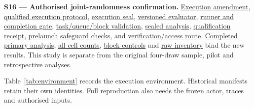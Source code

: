 \documentclass[12pt,a4paper]{article}
\begin{document}
\label{source-s16}

\textbf{S16 --- Authorised joint-randomness confirmation.} \href{\detokenize{../joint_confirmation_2026-09-08/confirmation/EXECUTION_AMENDMENT.md}}{Execution amendment}, \href{\detokenize{../joint_confirmation_2026-09-08/confirmation/PROTOCOL_EXECUTION.md}}{qualified execution protocol}, \href{\detokenize{../joint_confirmation_2026-09-08/confirmation/SEALED_EXECUTION.json}}{execution seal}, \href{\detokenize{../joint_confirmation_2026-09-08/experimental/evaluator_v2.py}}{versioned evaluator}, \href{\detokenize{../joint_confirmation_2026-09-08/confirmation/runner.py}}{runner and completion gate}, \href{\detokenize{../joint_confirmation_2026-09-08/confirmation/validation.py}}{task/queue/block validation}, \href{\detokenize{../joint_confirmation_2026-09-08/confirmation/analyse.py}}{sealed analysis}, \href{\detokenize{../joint_confirmation_2026-09-08/evidence/QUALIFICATION.json}}{qualification receipt}, \href{\detokenize{../joint_confirmation_2026-09-08/evidence/QUALIFICATION_FOLLOWUP.json}}{prelaunch safeguard checks}, and \href{\detokenize{../joint_confirmation_2026-09-08/README.md}}{verification/access route}. \href{\detokenize{../joint_confirmation_2026-09-08/evidence/ANALYSIS.json}}{Completed primary analysis}, \href{\detokenize{../joint_confirmation_2026-09-08/evidence/CELL_RESULTS.csv}}{all cell counts}, \href{\detokenize{../joint_confirmation_2026-09-08/evidence/BLOCK_CONTROLS.json}}{block controls} and \href{\detokenize{../joint_confirmation_2026-09-08/evidence/RAW_INVENTORY.json}}{raw inventory} bind the new results. This study is separate from the original four-draw sample, pilot and retrospective analyses.

Table~\ref{tab:environment} records the execution environment. Historical manifests retain their own identities. Full reproduction also needs the frozen actor, traces and authorised inputs.

\label{source-s17}
\end{document}
